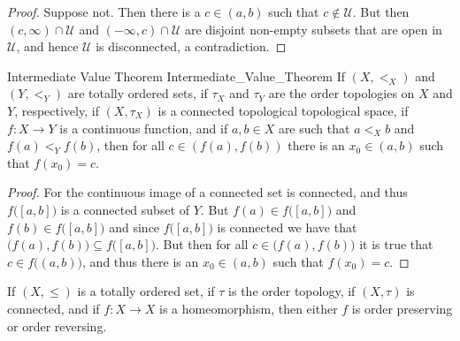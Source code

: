 \documentclass{article}                                                        %
\begin{document}
        \begin{proof}
                Suppose not. Then there is a $c\in(a,b)$ such that
                $c\notin\mathcal{U}$. But then $(c,\infty)\cap\mathcal{U}$ and
                $(\minus\infty,c)\cap\mathcal{U}$ are disjoint non-empty subsets
                that are open in $\mathcal{U}$, and hence $\mathcal{U}$ is
                disconnected, a contradiction.
        \end{proof}
        \begin{ltheorem}{Intermediate Value Theorem}
                            {Intermediate_Value_Theorem}
                If $(X,<_{X})$ and $(Y,<_{Y})$ are totally ordered sets, if
                $\tau_{X}$ and $\tau_{Y}$ are the order topologies on $X$ and
                $Y$, respectively, if $(X,\tau_{X})$ is a connected topological
                topological space, if $f:X\rightarrow{Y}$ is a continuous
                function, and if $a,b\in{X}$ are such that $a<_{X}b$ and
                $f(a)<_{Y}f(b)$, then for all $c\in(f(a),f(b))$ there is an
                $x_{0}\in(a,b)$ such that $f(x_{0})=c$.
        \end{ltheorem}
        \begin{proof}
                For the continuous image of a connected set is connected, and
                thus $f\big([a,b]\big)$ is a connected subset of $Y$. But
                $f(a)\in{f}\big([a,b]\big)$ and $f(b)\in{f}\big([a,b]\big)$ and
                since $f\big([a,b]\big)$ is connected we have that
                $\big(f(a),f(b)\big)\subseteq{f}\big([a,b]\big)$. But then for
                all $c\in\big(f(a),f(b)\big)$ it is true that
                $c\in{f}\big((a,b)\big)$, and thus there is an $x_{0}\in(a,b)$
                such that $f(x_{0})=c$.
        \end{proof}
        \begin{theorem}
                If $(X,\leq)$ is a totally ordered set, if $\tau$ is the order
                topology, if $(X,\tau)$ is connected, and if $f:X\rightarrow{X}$
                is a homeomorphism, then either $f$ is order preserving or
                order reversing.
        \end{theorem}
\end{document}
